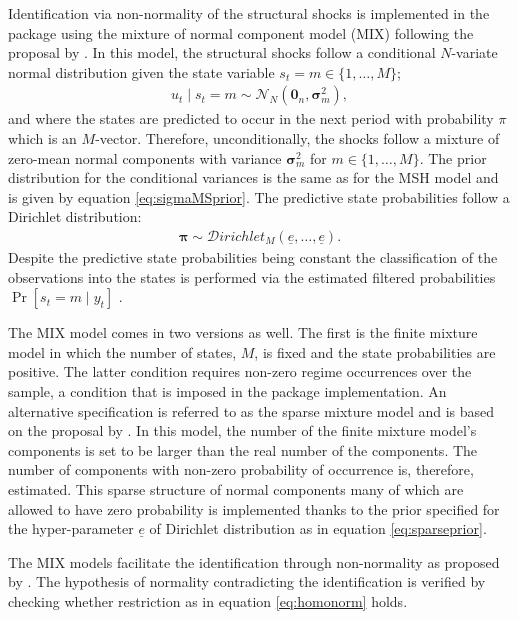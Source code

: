 \documentclass[
  nojss]{jss}
\begin{document}
Identification via non-normality of the structural shocks is implemented
in the package using the mixture of normal component model (MIX)
following the proposal by \cite{Wozniak2015}. In this model, the
structural shocks follow a conditional \(N\)-variate normal distribution
given the state variable \(s_t=m\in\{1,\dots,M\}\); \begin{align}
u_t\mid s_t=m \sim\mathcal{N}_N\left(\mathbf{0}_n, \boldsymbol{\sigma}_m^2 \right),
\end{align} and where the states are predicted to occur in the next
period with probability \(\pi\) which is an \(M\)-vector. Therefore,
unconditionally, the shocks follow a mixture of zero-mean normal
components with variance \(\boldsymbol{\sigma}_m^2\) for
\(m\in\{1,\dots,M\}\). The prior distribution for the conditional
variances is the same as for the MSH model and is given by equation
\eqref{eq:sigmaMSprior}. The predictive state probabilities follow a
Dirichlet distribution: \begin{align}
\boldsymbol{\pi} \sim\mathcal{D}irichlet_M(\underline{e}, \dots, \underline{e}).\label{eq:dirichletmix}
\end{align} Despite the predictive state probabilities being constant
the classification of the observations into the states is performed via
the estimated filtered probabilities \(\Pr[s_t=m\mid y_t]\)
\citep[see][for a recent review of the method]{song2021markov}.

The MIX model comes in two versions as well. The first is the finite
mixture model \citep[see e.g.][]{FruhwirthSchnatter2006} in which the
number of states, \(M\), is fixed and the state probabilities are
positive. The latter condition requires non-zero regime occurrences over
the sample, a condition that is imposed in the package implementation.
An alternative specification is referred to as the sparse mixture model
and is based on the proposal by \cite{malsiner2016model}. In this model,
the number of the finite mixture model's components is set to be larger
than the real number of the components. The number of components with
non-zero probability of occurrence is, therefore, estimated. This sparse
structure of normal components many of which are allowed to have zero
probability is implemented thanks to the prior specified for the
hyper-parameter \(\underline{e}\) of Dirichlet distribution as in
equation \eqref{eq:sparseprior}.

The MIX models facilitate the identification through non-normality as
proposed by \cite{Lanne2010}. The hypothesis of normality contradicting
the identification is verified by checking whether restriction as in
equation \eqref{eq:homonorm} holds.
\end{document}
